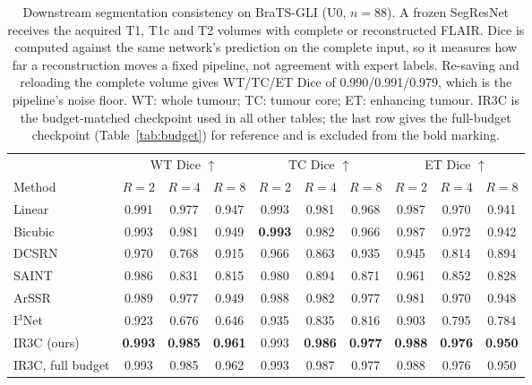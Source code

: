 \begin{table}[pos=t]
\caption{Downstream segmentation consistency on BraTS-GLI (U0, $n=88$). A frozen SegResNet receives the acquired T1, T1c and T2 volumes with complete or reconstructed FLAIR. Dice is computed against the same network's prediction on the complete input, so it measures how far a reconstruction moves a fixed pipeline, not agreement with expert labels. Re-saving and reloading the complete volume gives WT/TC/ET Dice of 0.990/0.991/0.979, which is the pipeline's noise floor. WT: whole tumour; TC: tumour core; ET: enhancing tumour. IR3C is the budget-matched checkpoint used in all other tables; the last row gives the full-budget checkpoint (Table~\ref{tab:budget}) for reference and is excluded from the bold marking.}
\label{tab:downstream}
\small
\begin{tabular*}{\textwidth}{@{\extracolsep{\fill}}lccccccccc@{}}
\toprule
& \multicolumn{3}{c}{WT Dice $\uparrow$} & \multicolumn{3}{c}{TC Dice $\uparrow$} & \multicolumn{3}{c}{ET Dice $\uparrow$} \\
\cmidrule(lr){2-4}\cmidrule(lr){5-7}\cmidrule(lr){8-10}
Method & $R=2$ & $R=4$ & $R=8$ & $R=2$ & $R=4$ & $R=8$ & $R=2$ & $R=4$ & $R=8$ \\
\midrule
Linear & 0.991 & 0.977 & 0.947 & 0.993 & 0.981 & 0.968 & 0.987 & 0.970 & 0.941 \\
Bicubic & 0.993 & 0.981 & 0.949 & \textbf{0.993} & 0.982 & 0.966 & 0.987 & 0.972 & 0.942 \\
DCSRN & 0.970 & 0.768 & 0.915 & 0.966 & 0.863 & 0.935 & 0.945 & 0.814 & 0.894 \\
SAINT & 0.986 & 0.831 & 0.815 & 0.980 & 0.894 & 0.871 & 0.961 & 0.852 & 0.828 \\
ArSSR & 0.989 & 0.977 & 0.949 & 0.988 & 0.982 & 0.977 & 0.981 & 0.970 & 0.948 \\
I$^3$Net & 0.923 & 0.676 & 0.646 & 0.935 & 0.835 & 0.816 & 0.903 & 0.795 & 0.784 \\
IR3C (ours) & \textbf{0.993} & \textbf{0.985} & \textbf{0.961} & 0.993 & \textbf{0.986} & \textbf{0.977} & \textbf{0.988} & \textbf{0.976} & \textbf{0.950} \\
\midrule
IR3C, full budget & 0.993 & 0.985 & 0.962 & 0.993 & 0.987 & 0.977 & 0.988 & 0.976 & 0.950 \\
\bottomrule
\end{tabular*}
\end{table}
